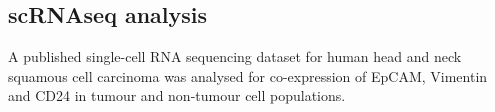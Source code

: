 \documentclass[11pt]{article}
\begin{document}
\subsection{scRNAseq analysis}

A published single-cell RNA sequencing dataset for human head and neck squamous cell carcinoma \citep{puram2017} was analysed for co-expression of EpCAM, Vimentin and CD24 in tumour and non-tumour cell populations.



\end{document}
